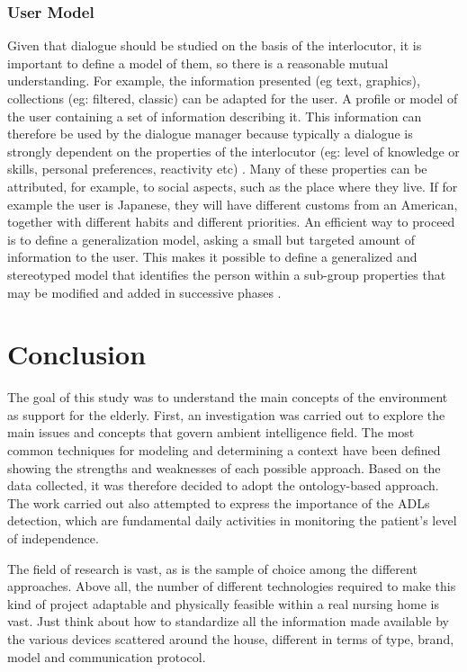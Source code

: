 \documentclass{thesisreport}
\begin{document}
 \subsection{User Model}
 Given that dialogue should be studied on the basis of the interlocutor, it is important to define a model of them, so there is a reasonable mutual understanding. For example, the information presented (eg text, graphics), collections (eg: filtered, classic) can be adapted for the user. A profile or model of the user containing a set of information describing it. This information can therefore be used by the dialogue manager because typically a dialogue is strongly dependent on the properties of the interlocutor (eg: level of knowledge or skills, personal preferences, reactivity etc) \cite{fong2001collaboration}.
 Many of these properties can be attributed, for example, to social aspects, such as the place where they live. If for example the user is Japanese, they will have different customs from an American, together with different habits and different priorities. An efficient way to proceed is to define a generalization model, asking a small but targeted amount of information to the user. This makes it possible to define a generalized and stereotyped model that identifies the person within a sub-group properties that may be modified and added in successive phases \cite{fong2001collaboration}.

 \chapter{Conclusion}
 The goal of this study was to understand the main concepts of the environment as support for the elderly.
 First, an investigation was carried out to explore the main issues and concepts that govern ambient intelligence field.
 The most common techniques for modeling and determining a context have been defined showing the strengths and weaknesses of each possible approach. Based on the data collected, it was therefore decided to adopt the ontology-based approach.
 The work carried out also attempted to express the importance of the ADLs detection, which are fundamental daily activities in monitoring the patient's level of independence.
 
 The field of research is vast, as is the sample of choice among the different approaches. Above all, the number of different technologies required to make this kind of project adaptable and physically feasible within a real nursing home is vast. Just think about how to standardize all the information made available by the various devices scattered around the house, different in terms of type, brand, model and communication protocol.
 
\end{document}
